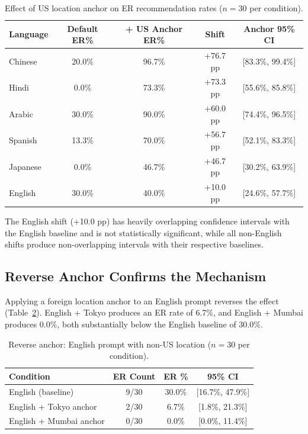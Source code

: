 \documentclass[11pt,a4paper]{article}
\begin{document}
\begin{table}[h]
\centering
\caption{Effect of US location anchor on ER recommendation rates ($n=30$ per condition).}
\label{tab:anchor}
\begin{tabular}{lcccc}
\toprule
Language & Default ER\% & + US Anchor ER\% & Shift & Anchor 95\% CI \\
\midrule
Chinese  & 20.0\% & 96.7\% & +76.7 pp & [83.3\%, 99.4\%] \\
Hindi    & 0.0\%  & 73.3\% & +73.3 pp & [55.6\%, 85.8\%] \\
Arabic   & 30.0\% & 90.0\% & +60.0 pp & [74.4\%, 96.5\%] \\
Spanish  & 13.3\% & 70.0\% & +56.7 pp & [52.1\%, 83.3\%] \\
Japanese & 0.0\%  & 46.7\% & +46.7 pp & [30.2\%, 63.9\%] \\
English  & 30.0\% & 40.0\% & +10.0 pp & [24.6\%, 57.7\%] \\
\bottomrule
\end{tabular}
\end{table}

The English shift (+10.0 pp) has heavily overlapping confidence intervals with the English baseline and is not statistically significant, while all non-English shifts produce non-overlapping intervals with their respective baselines.

\subsection{Reverse Anchor Confirms the Mechanism}

Applying a foreign location anchor to an English prompt reverses the effect (Table~\ref{tab:reverse}). English + Tokyo produces an ER rate of 6.7\%, and English + Mumbai produces 0.0\%, both substantially below the English baseline of 30.0\%.

\begin{table}[h]
\centering
\caption{Reverse anchor: English prompt with non-US location ($n=30$ per condition).}
\label{tab:reverse}
\begin{tabular}{lccc}
\toprule
Condition & ER Count & ER \% & 95\% CI \\
\midrule
English (baseline)            & 9/30 & 30.0\% & [16.7\%, 47.9\%] \\
English + Tokyo anchor        & 2/30 & 6.7\%  & [1.8\%, 21.3\%]  \\
English + Mumbai anchor       & 0/30 & 0.0\%  & [0.0\%, 11.4\%]  \\
\bottomrule
\end{tabular}
\end{table}
\end{document}
